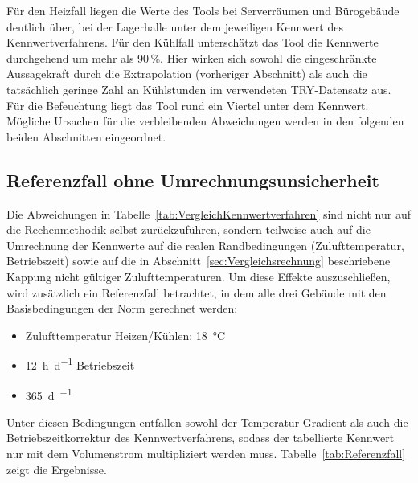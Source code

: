\documentclass{scrreprt}
\begin{document}
Für den Heizfall liegen die Werte des Tools bei Serverräumen und
Bürogebäude deutlich über, bei der Lagerhalle unter dem jeweiligen
Kennwert des Kennwertverfahrens. Für den Kühlfall unterschätzt das
Tool die Kennwerte durchgehend um mehr als \num{90}\,\%. Hier wirken sich
sowohl die eingeschränkte Aussagekraft durch die Extrapolation
(vorheriger Abschnitt) als auch die tatsächlich geringe Zahl an
Kühlstunden im verwendeten \ac{TRY}-Datensatz aus. Für die
Befeuchtung liegt das Tool rund ein Viertel unter dem Kennwert.
Mögliche Ursachen für die verbleibenden Abweichungen werden in den
folgenden beiden Abschnitten eingeordnet.

\subsection{Referenzfall ohne Umrechnungsunsicherheit}\label{sec:Referenzfall}
Die Abweichungen in Tabelle~\ref{tab:VergleichKennwertverfahren} sind
nicht nur auf die Rechenmethodik selbst zurückzuführen, sondern
teilweise auch auf die Umrechnung der Kennwerte auf die realen
Randbedingungen (Zulufttemperatur, Betriebszeit) sowie auf die in
Abschnitt~\ref{sec:Vergleichsrechnung} beschriebene Kappung nicht
gültiger Zulufttemperaturen. Um diese Effekte auszuschließen, wird
zusätzlich ein Referenzfall betrachtet, in dem alle drei Gebäude mit
den Basisbedingungen der Norm gerechnet werden:

\begin{itemize}
    \item Zulufttemperatur Heizen/Kühlen: \SI{18}{\celsius}
    \item \SI{12}{\hour\per\day} Betriebszeit
    \item \SI{365}{\day\per\year}
\end{itemize}

Unter diesen Bedingungen entfallen sowohl der Temperatur-Gradient als auch die Betriebszeitkorrektur des Kennwertverfahrens, sodass der
tabellierte Kennwert nur mit dem Volumenstrom multipliziert werden muss. Tabelle~\ref{tab:Referenzfall}
zeigt die Ergebnisse.
\end{document}
